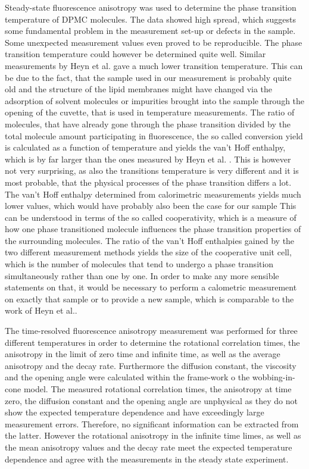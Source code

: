 \documentclass{scrartcl}
\numberwithin{equation}{section}
\numberwithin{figure}{section}
\numberwithin{table}{section}
\begin{document}
Steady-state fluorescence anisotropy was used to determine the phase transition temperature of DPMC molecules. The data showed high spread, which suggests some fundamental problem in the measurement set-up or defects in the sample. Some unexpected measurement values even proved to be reproducible. The phase transition temperature could however be determined quite well. Similar measurements by Heyn et al. \cite{heyn} gave a much lower transition temperature. This can be due to the fact, that the sample used in our measurement is probably quite old and the structure of the lipid membranes might have changed via the adsorption of solvent molecules or impurities brought into the sample through the opening of the cuvette, that is used in temperature measurements. The ratio of molecules, that have already gone through the phase transition divided by the total molecule amount participating in fluorescence, the so called conversion yield is calculated as a function of temperature and yields the van't Hoff enthalpy, which is by far larger than the ones measured by Heyn et al. \cite{heyn}. This is however not very surprising, as also the transitions temperature is very different and it is most probable, that the physical processes of the phase transition differs a lot. The van't Hoff enthalpy determined from calorimetric measurements yields much lower values, which would have probably also been the case for our sample This can be understood in terms of the so called cooperativity, which is a measure of how one phase transitioned molecule influences the phase transition properties of the surrounding molecules. The ratio of the van't Hoff enthalpies gained by the two different measurement methods yields the size of the cooperative unit cell, which is the number of molecules that tend to undergo a phase transition simultaneously rather than one by one. In order to make any more sensible statements on that, it would be necessary to perform a calometric measurement on exactly that sample or to provide a new sample, which is comparable to the work of Heyn et al..

The time-resolved fluorescence anisotropy measurement was performed for three different temperatures in order to determine the rotational correlation times, the anisotropy in the limit of zero time and infinite time, as well as the average anisotropy and the decay rate. Furthermore the diffusion constant, the viscosity and the opening angle were calculated within the frame-work o the wobbing-in-cone model. The measured rotational correlation times, the anisotropy at time zero, the diffusion constant and the opening angle are unphysical as they do not show the expected temperature dependence and have exceedingly large measurement errors. Therefore, no significant information can be extracted from the latter. However the rotational anisotropy in the infinite time limes, as well as the mean anisotropy values and the decay rate meet the expected temperature dependence and agree with the measurements in the steady state experiment.








 

\end{document}

